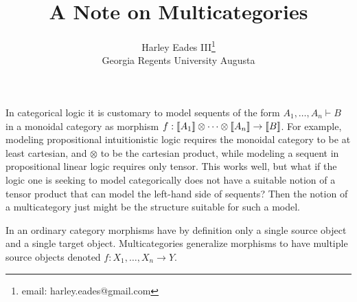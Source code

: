 \documentclass{article}
\title{A Note on Multicategories}
\author{Harley Eades III\footnote{email: harley.eades@gmail.com}\\ Georgia Regents University Augusta}
\date{}
\begin{document}
\maketitle  

In categorical logic it is customary to model sequents of the form
$A_1,\ldots,A_n \vdash B$ in a monoidal category as morphism $f :
\llbracket A_1 \rrbracket \otimes \cdots \otimes \llbracket A_n \rrbracket \to \llbracket B \rrbracket$.  For
example, modeling propositional intuitionistic logic requires the
monoidal category to be at least cartesian, and $\otimes$ to be the
cartesian product, while modeling a sequent in propositional linear
logic requires only tensor.  This works well, but what if the logic
one is seeking to model categorically does not have a suitable notion
of a tensor product that can model the left-hand side of sequents?
Then the notion of a multicategory just might be the structure
suitable for such a model.

In an ordinary category morphisms have by definition only a single
source object and a single target object.  Multicategories generalize
morphisms to have multiple source objects denoted $f : X_1,\ldots,X_n
\to Y$.

\nocite{*}


\end{document}
